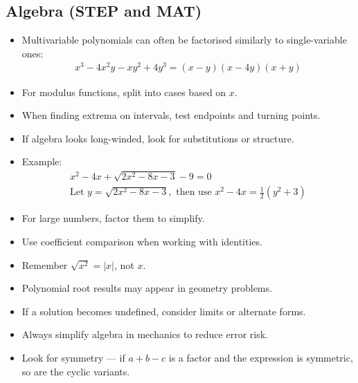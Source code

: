 \documentclass[11pt]{article}
\begin{document}
\subsection{Algebra (STEP and MAT)}
\begin{itemize}
\item Multivariable polynomials can often be factorised similarly to single-variable ones:
\begin{align*}
x^3 - 4x^2y - xy^2 + 4y^3 = (x - y)(x - 4y)(x + y)
\end{align*}
\item For modulus functions, split into cases based on $x$.
\item When finding extrema on intervals, test endpoints and turning points.
\item If algebra looks long-winded, look for substitutions or structure.
\item Example:
\begin{align*}
x^2 - 4x + \sqrt{2x^2 - 8x - 3} - 9 = 0 \\
\text{Let } y = \sqrt{2x^2 - 8x - 3}, \text{ then use } x^2 - 4x = \tfrac{1}{2}(y^2 + 3)
\end{align*}
\item For large numbers, factor them to simplify.
\item Use coefficient comparison when working with identities.
\item Remember $\sqrt{x^2} = |x|$, not $x$.
\item Polynomial root results may appear in geometry problems.
\item If a solution becomes undefined, consider limits or alternate forms.
\item Always simplify algebra in mechanics to reduce error risk.
\item Look for symmetry --- if $a + b - c$ is a factor and the expression is symmetric, so are the cyclic variants.
\end{itemize}
\end{document}

